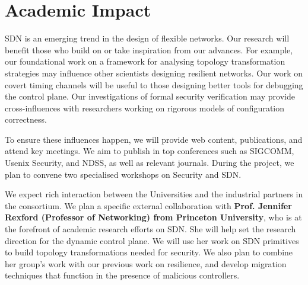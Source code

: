 \section{Academic Impact}

SDN is an emerging trend in the design of %
flexible networks. Our research will benefit those who build on or
take inspiration from our advances. For example, our foundational work
on a framework for analysing topology transformation strategies may
influence other scientists designing resilient
networks. Our work on covert timing channels will be useful to those designing
better tools for debugging the control plane. Our investigations of
formal security verification may provide cross-influences with
researchers working on rigorous models of configuration correctness. %

To ensure these influences happen, we will
provide web content, publications, and attend key meetings. We
aim to publish in top conferences such as SIGCOMM, Usenix Security, and
NDSS, as well as relevant journals.  During the project, we plan
to convene two specialised workshops on Security and SDN.

We expect rich interaction between the Universities and the industrial partners
in the consortium.  We plan a specific external collaboration with {\bf
Prof. Jennifer Rexford (Professor of Networking) from Princeton University}, who
is at the forefront of academic research efforts on SDN. She will help set the
research direction for the dynamic control plane. We will use her work on SDN
primitives to build topology transformations needed for security.  We also plan
to combine her group's work with our previous work on resilience, and develop
migration techniques that function in the presence of malicious controllers.

%




